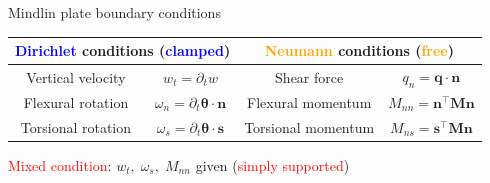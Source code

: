 \documentclass[aspectratio=169]{ISAE-Beamer}
\begin{document}
\begin{frame}{Mindlin plate boundary conditions}
\begin{overlayarea}{\textwidth}{\textheight}
\begin{table}
	\centering
	\begin{tabular}{cc|cc}
		\hline 
		\multicolumn{2}{c}{\textcolor{blue}{Dirichlet} conditions (\textcolor{blue}{clamped})}&  \multicolumn{2}{c}{\textcolor{orange}{Neumann} conditions (\textcolor{orange}{free})} \\ 
		\hline 
		Vertical velocity  & $w_t = \partial_t {w}$ & Shear force  & $q_n = \bm{q} \cdot \bm{n}$ \\ 
		Flexural rotation  & $\omega_n = \partial_t {\bm{\theta}} \cdot \bm{n}$ & Flexural momentum & $M_{nn} = \bm{n}^\top\bm{M}\bm{n}$ \\  
		Torsional rotation & $\omega_s = \partial_t {\bm{\theta}} \cdot \bm{s}$ & Torsional momentum  & $ M_{ns} = \bm{s}^\top\bm{M}\bm{n}$  \\ 
		\hline 
	\end{tabular}
\end{table}
\textcolor{red}{Mixed condition}: $w_t,\;  \omega_s, \; M_{nn}$ given (\textcolor{red}{simply supported})
\end{overlayarea}	

\end{frame}
\end{document}
